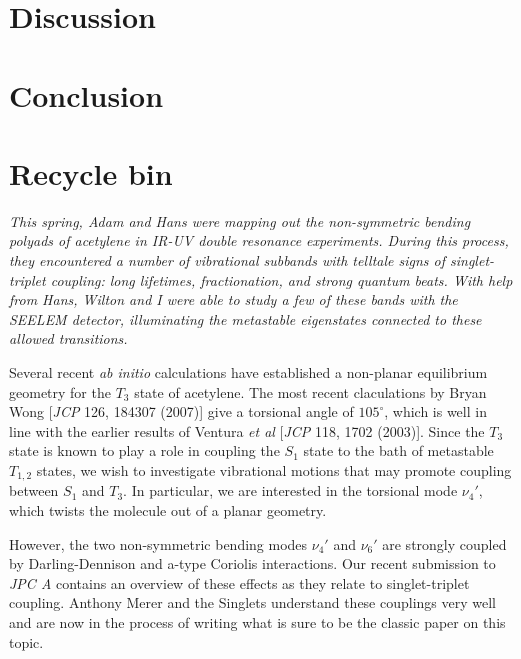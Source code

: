 \documentclass[12pt]{mitthesis}
\begin{document}

\section{Discussion}



\section{Conclusion}

\section{Recycle bin}

\emph{This spring, Adam and Hans were mapping out the non-symmetric
  bending polyads of acetylene in IR-UV double resonance experiments.
  During this process, they encountered a number of vibrational
  subbands with telltale signs of singlet-triplet coupling: long
  lifetimes, fractionation, and strong quantum beats.  With help from
  Hans, Wilton and I were able to study a few of these bands with the
  SEELEM detector, illuminating the metastable eigenstates connected
  to these allowed transitions.}


Several recent \emph{ab initio} calculations have established a
non-planar equilibrium geometry for the $T_3$ state of acetylene.  The
most recent claculations by Bryan Wong [\emph{JCP} 126, 184307 (2007)]
give a torsional angle of $105^\circ$, which is well in line with the
earlier results of Ventura \emph{et al} [\emph{JCP} 118, 1702 (2003)].
Since the $T_3$ state is known to play a role in coupling the $S_1$
state to the bath of metastable $T_{1,2}$ states, we wish to
investigate vibrational motions that may promote coupling between
$S_1$ and $T_3$.  In particular, we are interested in the torsional
mode $\nu_4'$, which twists the molecule out of a planar geometry.

However, the two non-symmetric bending modes $\nu_4'$ and $\nu_6'$ are
strongly coupled by Darling-Dennison and a-type Coriolis interactions.
Our recent submission to \emph{JPC A} contains an overview of these
effects as they relate to singlet-triplet coupling.  Anthony Merer and
the Singlets understand these couplings very well and are now in the
process of writing what is sure to be the classic paper on this topic.
\end{document}
